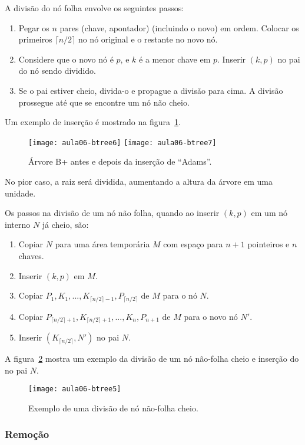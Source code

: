 A divisão do nó folha envolve os seguintes passos:
\begin{enumerate}
\item Pegar os $n$ pares (chave, apontador) (incluindo o novo) em ordem. Colocar os primeiros $\lceil n/2 \rceil$ no nó original e o restante no novo nó.
\item Considere que o novo nó é $p$, e $k$ é a menor chave em $p$. 
Inserir $(k,p)$ no pai do nó sendo dividido.
\item Se o pai estiver cheio, divida-o e propague a divisão para cima. A divisão prossegue até que se encontre um nó não cheio.
\end{enumerate}
%
Um exemplo de inserção é mostrado na figura~\ref{aula06:fig:btree6}.
%
\begin{figure}[!htb]
\centering
\texttt{[image: aula06-btree6]}
\texttt{[image: aula06-btree7]}
\caption{Árvore B+ antes e depois da inserção de ``Adams''.}
\label{aula06:fig:btree6}
\end{figure}

No pior caso, a raiz será dividida, aumentando a altura da árvore em uma
unidade.

Os passos na divisão de um nó não folha, quando ao inserir $(k,p)$
em um nó interno $N$ já cheio, são:
\begin{enumerate}
\item Copiar $N$ para uma área temporária $M$ com espaço para $n+1$ pointeiros
e $n$ chaves.
\item Inserir $(k,p)$ em $M$.
\item Copiar $P_1,K_1, ..., K_{\lceil n/2 \rceil -1}, P_{\lceil n/2 \rceil}$ de
$M$ para o nó $N$. 
\item Copiar $P_{\lceil n/2 \rceil + 1}, K_{\lceil n/2 \rceil+1}, ..., K_n,
P_{n+1}$ de $M$ para o novo nó $N'$.
\item Inserir $(K_{\lceil n/2 \rceil},N')$ no pai $N$.
\end{enumerate}
A figura~\ref{aula06:fig:btree5} mostra um exemplo da divisão de um nó
não-folha cheio e inserção do no pai $N$.
%
\begin{figure}[!htb]
\centering
\texttt{[image: aula06-btree5]}
\caption{Exemplo de uma divisão de nó não-folha cheio.}
\label{aula06:fig:btree5}
\end{figure}

\subsubsection{Remoção}

